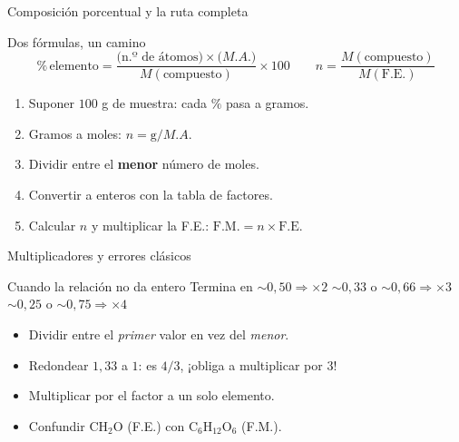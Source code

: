 \documentclass[aspectratio=169]{beamer}
\newcommand{\pc}{\text{\%}}
\begin{document}
\begin{frame}{Composición porcentual y la ruta completa}
  \begin{block}{Dos fórmulas, un camino}
    \[
      \pc\,\text{elemento} = \frac{\bigl(\text{n.º de átomos}\bigr)\times \bigl(M.A.\bigr)}{M(\text{compuesto})}\times 100
      \qquad
      n = \frac{M(\text{compuesto})}{M(\text{F.E.})}
    \]
  \end{block}
  \vspace{2pt}
  \begin{mwpasos}
    \begin{enumerate}
      \item Suponer $100$ g de muestra: cada $\pc$ pasa a gramos.
      \item Gramos a moles: $n = \text{g}/M.A.$
      \item Dividir entre el \textbf{menor} número de moles.
      \item Convertir a enteros con la tabla de factores.
      \item Calcular $n$ y multiplicar la F.E.: $\text{F.M.} = n\times\text{F.E.}$
    \end{enumerate}
  \end{mwpasos}
\end{frame}

\begin{frame}{Multiplicadores y errores clásicos}
  \begin{block}{Cuando la relación no da entero}
    \centering
    \small
    Termina en $\sim0{,}50 \Rightarrow \times2$
    \qquad
    $\sim0{,}33$ o $\sim0{,}66 \Rightarrow \times3$
    \qquad
    $\sim0{,}25$ o $\sim0{,}75 \Rightarrow \times4$
  \end{block}
  \vspace{2pt}
  \begin{mwextra}
    \begin{itemize}
      \item Dividir entre el \emph{primer} valor en vez del \emph{menor}.
      \item Redondear $1{,}33$ a $1$: es $4/3$, ¡obliga a multiplicar por $3$!
      \item Multiplicar por el factor a un solo elemento.
      \item Confundir $\text{CH}_2\text{O}$ (F.E.) con $\text{C}_6\text{H}_{12}\text{O}_6$ (F.M.).
    \end{itemize}
  \end{mwextra}
\end{frame}
\end{document}
